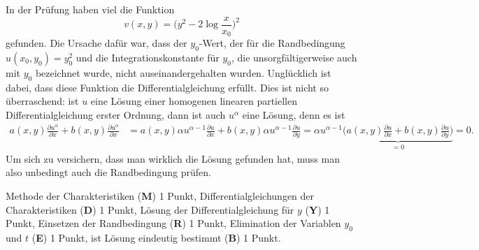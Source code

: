 \begin{diskussion}
In der Prüfung haben viel die Funktion
\[
v(x,y)=\biggl(y^2-2\log\frac{x}{x_0}\biggr)^2
\]
gefunden.
Die Ursache dafür war, dass der $y_0$-Wert, der für die Randbedingung
$u(x_0,y_0)=y_0^2$ und die Integrationskonstante für $y_0$, die
unsorgfältigerweise auch mit $y_0$ bezeichnet wurde, nicht
auseinandergehalten wurden.
Unglücklich ist dabei, dass diese Funktion die Differentialgleichung
erfüllt.
Dies ist nicht so überraschend: ist $u$ eine Lösung einer homogenen
linearen partiellen Differentialgleichung erster Ordnung, dann ist auch
$u^\alpha$ eine Lösung, denn es ist
\begin{align*}
a(x,y)\frac{\partial u^{\alpha}}{\partial x}
+
b(x,y)\frac{\partial u^{\alpha}}{\partial x}
&=
a(x,y)\alpha u^{\alpha-1}\frac{\partial u}{\partial x}
+
b(x,y)\alpha u^{\alpha-1}\frac{\partial u}{\partial y}
=
\alpha u^{\alpha-1}\underbrace{
\biggl(a(x,y)\frac{\partial u}{\partial x}
+
b(x,y)\frac{\partial u}{\partial y}\biggr)}_{\displaystyle=0}=0.
\end{align*}
Um sich zu versichern, dass man wirklich die Lösung gefunden hat, muss
man also unbedingt auch die Randbedingung prüfen.
\end{diskussion}

\begin{bewertung}
Methode der Charakteristiken ({\bf M}) 1 Punkt,
Differentialgleichungen der Charakteristiken ({\bf D}) 1 Punkt,
Lösung der Differentialgleichung für $y$ ({\bf Y}) 1 Punkt,
Einsetzen der Randbedingung ({\bf R}) 1 Punkt,
Elimination der Variablen $y_0$ und $t$ ({\bf E}) 1 Punkt,
ist Lösung eindeutig bestimmt ({\bf B}) 1 Punkt.
\end{bewertung}
